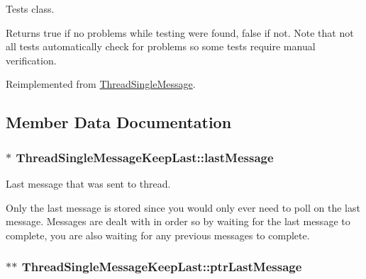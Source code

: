 Tests class. 

\begin{DoxyReturn}{Returns}
true if no problems while testing were found, false if not. Note that not all tests automatically check for problems so some tests require manual verification. 
\end{DoxyReturn}


Reimplemented from \hyperlink{class_thread_single_message_a1bd833e3ffcd36b3cfe26648a7e74625}{ThreadSingleMessage}.



\subsection{Member Data Documentation}
\hypertarget{class_thread_single_message_keep_last_ae36c3229c8538b56a7fc4740a5d58d4f}{
\subsubsection[{lastMessage}]{$\ast$ {\bf ThreadSingleMessageKeepLast::lastMessage}}}
\label{class_thread_single_message_keep_last_ae36c3229c8538b56a7fc4740a5d58d4f}


Last message that was sent to thread. 

Only the last message is stored since you would only ever need to poll on the last message. Messages are dealt with in order so by waiting for the last message to complete, you are also waiting for any previous messages to complete. \hypertarget{class_thread_single_message_keep_last_a5a6db5f1ddd6002413c1424d87ff2152}{
\subsubsection[{ptrLastMessage}]{$\ast$$\ast$ {\bf ThreadSingleMessageKeepLast::ptrLastMessage}}}
\label{class_thread_single_message_keep_last_a5a6db5f1ddd6002413c1424d87ff2152}



